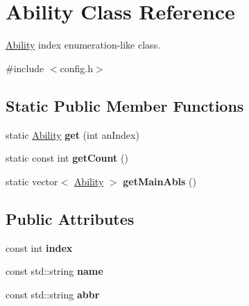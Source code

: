 \hypertarget{class_ability}{}\section{Ability Class Reference}
\label{class_ability}


\hyperlink{class_ability}{Ability} index enumeration-\/like class.  




{\ttfamily \#include $<$config.\+h$>$}

\subsection*{Static Public Member Functions}
\begin{DoxyCompactItemize}
\item 
\hypertarget{class_ability_a02a68db327aa25e3edc293aad7ba5140}{}\label{class_ability_a02a68db327aa25e3edc293aad7ba5140} 
static \hyperlink{class_ability}{Ability} {\bfseries get} (int an\+Index)
\item 
\hypertarget{class_ability_a842d304bb983572fbfd798daf8e281d2}{}\label{class_ability_a842d304bb983572fbfd798daf8e281d2} 
static const int {\bfseries get\+Count} ()
\item 
\hypertarget{class_ability_ae7589854024fa78fd3b66cb754238725}{}\label{class_ability_ae7589854024fa78fd3b66cb754238725} 
static vector$<$ \hyperlink{class_ability}{Ability} $>$ {\bfseries get\+Main\+Abls} ()
\end{DoxyCompactItemize}
\subsection*{Public Attributes}
\begin{DoxyCompactItemize}
\item 
\hypertarget{class_ability_aff7710a5626874db868b20d509f98ef5}{}\label{class_ability_aff7710a5626874db868b20d509f98ef5} 
const int {\bfseries index}
\item 
\hypertarget{class_ability_ad470145b0a86b45af95ecc1e98ceba73}{}\label{class_ability_ad470145b0a86b45af95ecc1e98ceba73} 
const std\+::string {\bfseries name}
\item 
\hypertarget{class_ability_ae04151dfa9eff37c2bd3b17a345ae014}{}\label{class_ability_ae04151dfa9eff37c2bd3b17a345ae014} 
const std\+::string {\bfseries abbr}
\end{DoxyCompactItemize}
